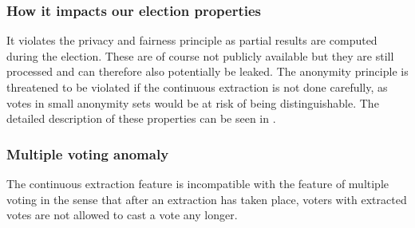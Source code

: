 \subsubsection{How it impacts our election properties}
It violates the privacy and fairness principle as partial results are computed during the election. These are of course not publicly available but they are still processed and can therefore also potentially be leaked.
The anonymity principle is threatened to be violated if the continuous extraction is not done carefully, as votes in small anonymity sets would be at risk of being distinguishable. The detailed description of these properties can be seen in .


\subsubsection{Multiple voting anomaly}
The continuous extraction feature is incompatible with the feature of multiple voting in the sense that after an extraction has taken place, voters with extracted votes are not allowed to cast a vote any longer.
